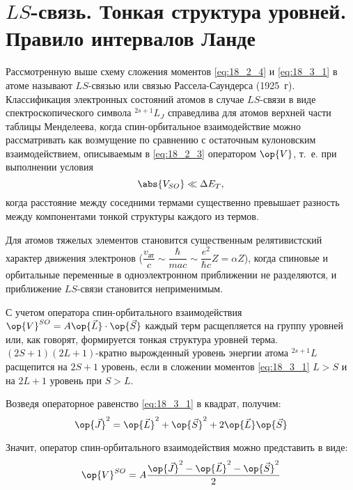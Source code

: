 \section{$LS$-связь. Тонкая структура уровней. Правило интервалов Ланде}

Рассмотренную выше схему сложения моментов \eqref{eq:18_2_4} и \eqref{eq:18_3_1} в атоме называют $LS$-связью  или связью Рассела-Саундерса\footnotemark{} (1925~г). Классификация электронных состояний атомов в случае $LS$-связи в виде спектроскопического символа $^{2s+1}L_J$ справедлива для атомов верхней части таблицы Менделеева\footnotemark{}, когда спин-орбитальное взаимодействие можно рассматривать как возмущение по сравнению с остаточным кулоновским взаимодействием, описываемым в \eqref{eq:18_2_3} оператором $\op{V}$, т.~е. при выполнении условия
%
\begin{equation}
\label{eq:18_4_1}
\abs{V_{SO}} \ll \Delta E_T,
\end{equation}
когда расстояние между соседними термами существенно превышает разность между компонентами тонкой структуры каждого из термов.
 
Для атомов тяжелых элементов становится существенным релятивистский характер движения электронов ($\dfrac{v_{\text{ат}}}{c} \sim \dfrac{\hbar}{m a c} \sim \dfrac{e^2}{\hbar c} Z = \alpha Z$), когда спиновые и орбитальные переменные в одноэлектронном приближении не разделяются, и приближение $LS$-связи становится неприменимым.

С учетом оператора спин-орбитального взаимодействия $\op{V}^{SO} = A \op{\vec{L}} \cdot \op{\vec{S}}$ каждый терм расщепляется на группу уровней или, как говорят, формируется тонкая структура уровней терма. $(2S + 1)(2L+1)$-кратно вырожденный уровень энергии атома $^{2s+1}L$ расщепится на $2S+1$ уровень, если в сложении моментов \eqref{eq:18_3_1} $L > S$ и на $2L+1$ уровень при $S > L$. 

Возведя операторное равенство \eqref{eq:18_3_1} в квадрат, получим:
$$
\op{\vec{J}}^2 = \op{\vec{L}}^2 + \op{\vec{S}}^2 + 2\op{\vec{L}}\op{\vec{S}}
$$

Значит, оператор спин-орбитального взаимодействия можно представить в виде:
\begin{equation}
\label{eq:18_4_2}
\op{V}^{SO} = A\frac{\op{\vec{J}}^2 - \op{\vec{L}}^2 - \op{\vec{S}}^2}{2}
\end{equation}


